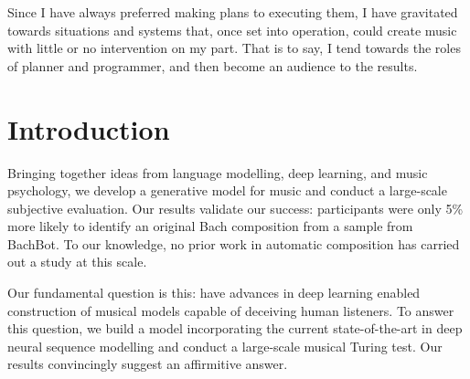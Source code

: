 

\begin{savequote}[75mm]
  Since I have always preferred making plans to executing them, I have
  gravitated towards situations and systems that, once set into operation,
  could create music with little or no intervention on my part. That is to say,
  I tend towards the roles of planner and programmer, and then become an
  audience to the results.
\end{savequote}

\chapter{Introduction}

\ifpdf
    \graphicspath{{Chapter1/Figs/Raster/}{Chapter1/Figs/PDF/}{Chapter1/Figs/}}
\else
    \graphicspath{{Chapter1/Figs/Vector/}{Chapter1/Figs/}}
\fi

Bringing together ideas from language modelling, deep learning, and music
psychology, we develop a generative model for music and conduct a large-scale
subjective evaluation. Our results validate our success: participants were only
5\% more likely to identify an original Bach composition from a sample from
BachBot. To our knowledge, no prior work in automatic composition has carried
out a study at this scale.

Our fundamental question is this: have advances in deep learning enabled
construction of musical models capable of deceiving human listeners. To answer this
question, we build a model incorporating the current state-of-the-art in deep
neural sequence modelling and conduct a large-scale musical Turing test. Our
results convincingly suggest an affirmitive answer.

